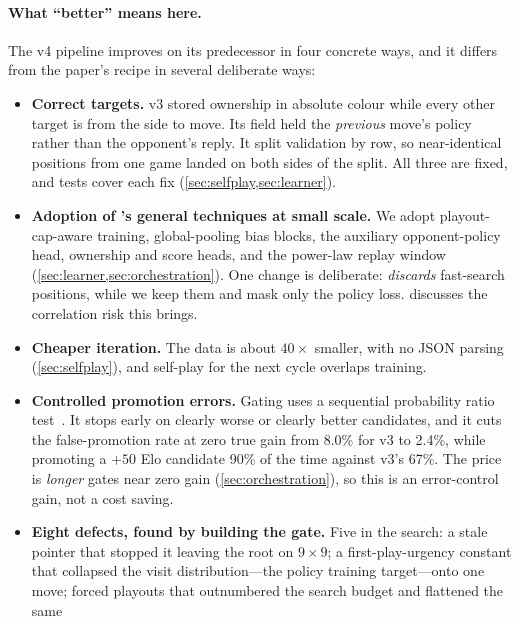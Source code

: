 \paragraph{What ``better'' means here.}
The v4 pipeline improves on its predecessor in four concrete ways, and it differs from the
\katago{} paper's recipe in several deliberate ways:
\begin{itemize}
  \item \textbf{Correct targets.} v3 stored ownership in absolute colour while every other
        target is from the side to move. Its  field held the
        \emph{previous} move's policy rather than the opponent's reply. It split
        validation by row, so near-identical positions from one game landed on both sides
        of the split. All three are fixed, and tests cover each fix
        (\cref{sec:selfplay,sec:learner}).
  \item \textbf{Adoption of \katago{}'s general techniques at small scale.} We adopt
        playout-cap-aware training, global-pooling bias blocks, the auxiliary
        opponent-policy head, ownership and score heads, and the power-law replay window
        (\cref{sec:learner,sec:orchestration}). One change is deliberate:
        \katago{} \emph{discards} fast-search positions, while we keep them and mask only
        the policy loss.  discusses the correlation risk this
        brings.
  \item \textbf{Cheaper iteration.} The data is about $40\times$ smaller, with no JSON
        parsing (\cref{sec:selfplay}), and self-play for the next cycle overlaps training.
  \item \textbf{Controlled promotion errors.} Gating uses a sequential probability ratio
        test~\citep{wald1945sequential}. It stops early on clearly worse or clearly better
        candidates, and it cuts the false-promotion rate at zero true gain from 8.0\% for
        v3 to 2.4\%, while promoting a $+50$ Elo candidate 90\% of the time against v3's
        67\%. The price is \emph{longer} gates near zero gain
        (\cref{sec:orchestration}), so this is an error-control gain, not a cost saving.
  \item \textbf{Eight defects, found by building the gate.} Five in the search: a stale
        pointer that stopped it leaving the root on $9\times9$; a first-play-urgency
        constant that collapsed the visit distribution---the policy training target---onto
        one move; forced playouts that outnumbered the search budget and flattened the same

\end{itemize}
